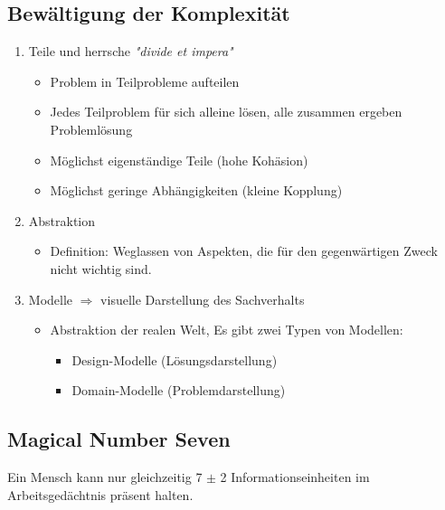 \subsection{Bewältigung der Komplexität}	
		\begin{enumerate}
			\item Teile und herrsche \textit{"divide et impera"}
					\begin{itemize}
						\item Problem in Teilprobleme aufteilen
						\item Jedes Teilproblem für sich alleine lösen, alle zusammen ergeben Problemlösung
						\item Möglichst eigenständige Teile (hohe Kohäsion)
						\item Möglichst geringe Abhängigkeiten (kleine Kopplung)
					\end{itemize}
			\item Abstraktion
					\begin{itemize}
						\item Definition: Weglassen von Aspekten, die für den gegenwärtigen Zweck nicht wichtig sind.
					\end{itemize}
			\item Modelle \newline
			$\Rightarrow$ visuelle Darstellung des Sachverhalts 
					\begin{itemize}
						\item Abstraktion der realen Welt, Es gibt zwei Typen von Modellen:
                        \begin{itemize}
                        \item Design-Modelle (Lösungsdarstellung)
                        \item Domain-Modelle (Problemdarstellung)
                        \end{itemize}
					\end{itemize}
		\end{enumerate}
\subsection{Magical Number Seven}
Ein Mensch kann nur gleichzeitig 7 $\pm$ 2 Informationseinheiten im Arbeitsgedächtnis präsent halten.
\clearpage
